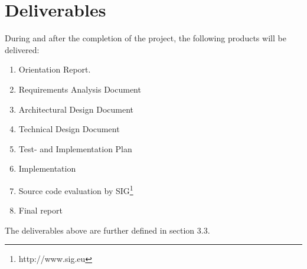\section{Deliverables}
\label{sec:deliverables}
During and after the completion of the project, the following products will be delivered:\\
\begin{enumerate}
\item Orientation Report. 
\item Requirements Analysis Document
\item Architectural Design Document
\item Technical Design Document
\item Test- and Implementation Plan
\item Implementation
\item Source code evaluation by SIG\footnote{http://www.sig.eu}
\item Final report 
\end{enumerate}
The deliverables above are further defined in section 3.3.